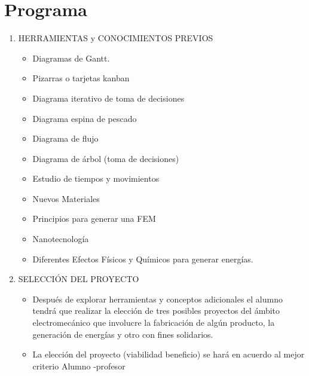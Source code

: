 \documentclass[../main]{subfiles}
\begin{document}
\section{Programa}
\begin{enumerate}
  \item HERRAMIENTAS y CONOCIMIENTOS PREVIOS
    \begin{itemize}
        Que el alumno Sepa seleccionar e implementar herramientas de
        planificación como:
      \item Diagramas de Gantt.
      \item Pizarras o tarjetas kanban
      \item Diagrama iterativo de toma de decisiones
      \item Diagrama espina de pescado
      \item Diagrama de flujo
      \item Diagrama de árbol (toma de decisiones)
      \item Estudio de tiempos y movimientos
      \item Nuevos Materiales
      \item Principios para generar una FEM
      \item Nanotecnología
      \item Diferentes Efectos Físicos y Químicos para
        generar energías.
    \end{itemize}
  \item SELECCIÓN DEL PROYECTO
    \begin{itemize}
      \item Después de explorar herramientas y conceptos
        adicionales el alumno tendrá que realizar la
        elección de tres posibles proyectos del ámbito
        electromecánico que involucre la fabricación de
        algún producto, la generación de energías y
        otro con fines solidarios.
      \item La elección del proyecto (viabilidad beneficio) se hará
        en acuerdo al mejor criterio
        Alumno -profesor
    \end{itemize}


\end{enumerate}
\end{document}
